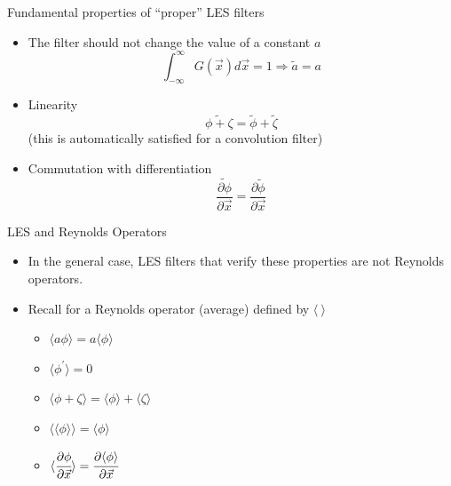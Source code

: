 \begin{frame}{Fundamental properties of ``proper'' LES filters}

\begin{itemize}
	\item The filter should not change the value of a constant $a$
	$$\int_{-\infty}^{\infty} G(\vec{x})d\vec{x} = 1 \Rightarrow \tilde a = a$$
	\item Linearity $$\widetilde{\phi + \zeta} = \tilde \phi + \tilde \zeta$$
	(this is automatically satisfied for a convolution filter)
	\item Commutation with differentiation
	$$\frac{\widetilde{\partial \phi}}{\partial \vec{x}} = \frac{\partial \tilde \phi}{\partial \vec{x}}$$
\end{itemize}
\end{frame}

\begin{frame}{LES and Reynolds Operators}

\begin{itemize}
	\item In the general case, LES filters that verify these properties are not Reynolds operators.
	\item Recall for a Reynolds operator (average) defined by $\langle \ \rangle$
	\begin{itemize}
		\item $\langle a\phi\rangle = a\langle \phi \rangle$
		\item $\langle \phi^\prime \rangle = 0$
		\item $\langle \phi + \zeta \rangle = \langle \phi \rangle + \langle \zeta \rangle$
		\item $\langle \langle \phi \rangle \rangle = \langle \phi \rangle$
		\item $\langle \cfrac{\partial \phi}{\partial \vec{x}}\rangle = \cfrac{\partial \langle \phi \rangle}{\partial \vec{x}}$	
	\end{itemize}
\end{itemize}
\end{frame}

